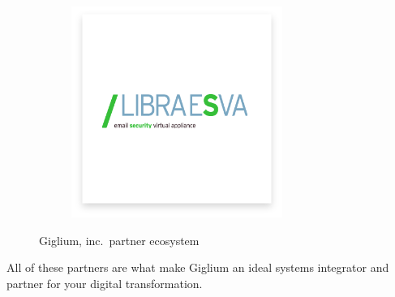 \begin{figure}[ht!]
\begin{subfigure}{\linewidth}
	\end{subfigure}\par\medskip
	\begin{subfigure}{\linewidth}
		\includegraphics[width=.25\linewidth]{./img/introduction/libraesva.png}\hfill
	\end{subfigure}
	\caption{Giglium, inc.\ partner ecosystem}\label{fig:partner}
\end{figure}

All of these partners are what make Giglium an ideal systems integrator and partner for your digital transformation.

